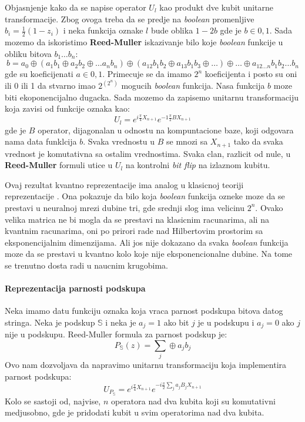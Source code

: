 \documentclass[12pt, letterpaper, oneside]{article}
\begin{document}
Objasnjenje kako da se napise operator $U_l$ kao produkt dve kubit unitarne transformacije. Zbog ovoga treba da se predje na \textit{boolean} promenljive $b_i=\frac{1}{2}(1-z_i)$ i 
neka funkcija oznake $l$ bude oblika $1-2b$ gde je $b \in {0,1}$. Sada mozemo da iskoristimo \textbf{Reed-Muller} iskazivanje bilo koje \textit{boolean} funkcije u obliku bitova $b_1 \dots b_n$:
\[
    b = a_0 \oplus (a_1b_1 \oplus a_2b_2 \oplus \dots a_nb_n) \oplus (a_{12}b_1b_2 \oplus a_{13}b_1b_3 \oplus \dots) \oplus \dots \oplus a_{12 \dots n}b_1b_2 \dots b_n
\]
gde su koeficijenati $a \in {0,1}$. Primecuje se da imamo $2^n$ koeficijenta i posto su oni ili 0 ili 1 da stvarno imao
$2^{(2^n)}$ mogucih \textit{boolean} funkcija. Nasa funkcija $b$ moze biti ekoponencijalno dugacka.
Sada mozemo da zapisemo unitarnu transformaciju koja zavisi od funkcije oznaka kao:
\[
    U_l = e^{i\frac{\pi}{4}X_{n+1}}e^{-1\frac{\pi}{2}BX_{n+1}}
\]
gde je $B$ operator, dijagonalan u odnostu na kompuntacione baze, koji odgovara nama data funklcija $b$. 
Svaka vrednostu u $B$ se mnozi sa $X_{n+1}$ tako da svaka vrednost je komutativna sa ostalim vrednostima. 
Svaka clan, razlicit od nule, u \textbf{Reed-Muller} formuli utice u $U_l$ na kontrolni \textit{bit flip} na izlaznom kubitu.

Ovaj rezultat kvantno reprezentacije ima analog u klasicnoj teoriji \\
reprezentacije \cite{Cybenko1989ApproximationBS}.
Ona pokazuje da bilo koja \textit{boolean} funkcija ozneke moze da se prestavi u neuralnoj mrezi dubine tri, gde srednji slog 
ima velicinu $2^n$. Ovako velika matrica ne bi mogla da se prestavi na klasicnim racunarima, ali na kvantnim racunarima, oni po prirori rade
nad Hilbertovim prostorim sa eksponencijalnim dimenzijama. Ali jos nije dokazano da svaka \textit{boolean} funkcija moze da se prestavi u
kvantno kolo koje nije eksponencionalne dubine. Na tome se trenutno dosta radi u naucnim krugobima.

\paragraph*{Reprezentacija parnosti podskupa}
Neka imamo datu funkciju oznaka koja vraca parnost podskupa bitova datog stringa. Neka je podskup $\mathbb{S}$
i neka je $a_j=1$ ako bit $j$ je u podskupu i $a_j=0$ ako $j$ nije u podskupu. Reed-Muller formula za parnost podskup je:
\[
    P_{\mathbb{S}}(z) = \sum_j \oplus a_jb_j
\]
Ovo nam dozvoljava da napravimo unitarnu transformaciju koja implementira parnost podskupa:
\[
    U_{P_{\mathbb{S}}} = e^{i\frac{\pi}{4}X_{n+1}}e^{-i\frac{\pi}{2}\sum_j a_jB_jX_{n+1}}
\]
Kolo se sastoji od, najvise, $n$ operatora nad dva kubita koji su komutativni medjusobno, gde je pridodati kubit u svim operatorima nad dva kubita.
\end{document}
